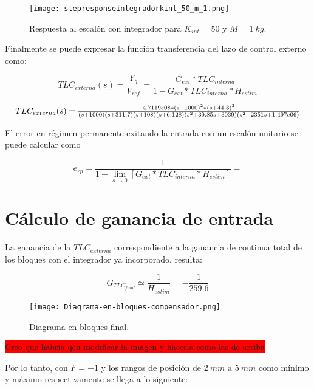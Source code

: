 \begin{figure}[H]
	\centering
	\texttt{[image: stepresponseintegradorkint\_50\_m\_1.png]}
	\caption{Respuesta al escalón con integrador para $K_{int} =50$ y $M = 1 \:kg$.}
	\label{fig:respuesta-al-escalon-con-k-50-M-1}
\end{figure}

Finalmente se puede expresar la función transferencia del lazo de control externo como:

\begin{equation}
	TLC_{externa}(s)=\frac{Y_g}{V_{ref}}=\frac{G_{ext}*TLC_{interna}}{1-G_{ext}*TLC_{interna}*H_{estim}}
\end{equation}

\begin{equation*}
\resizebox{.99\hsize}{!}
{
$
TLC_{externa}(s)=\frac{4.7119e08*(s+1000)^2*(s+44.3)^2}{(s+1000)(s+311.7)(s+108)(s+6.128)(s^2 + 39.85s + 3039)(s^2 + 2351s + 1.497e06)}
$
}
\end{equation*}

El error en régimen permanente exitando la entrada con un escalón unitario se puede calcular como

\begin{equation*}
	e_{rp}=\frac{1}{1-\lim\limits_{s \to 0}[G_{ext}*TLC_{interna}*H_{estim}]}=
\end{equation*}


\section{Cálculo de ganancia de entrada}

\noindent La ganancia de la $TLC_{externa}$ correspondiente a la ganancia de continua total de los bloques con el integrador ya incorporado, resulta:

\begin{equation} 
	G_{TLC_{final}} \simeq \frac{1}{H_{estim}} = - \frac{1}{259.6}
\end{equation}

\begin{figure}[H]
	\centering
	\texttt{[image: Diagrama-en-bloques-compensador.png]}
	\caption{Diagrama en bloques final.}
	\label{fig:diag-bloques-compensador}
\end{figure}

\colorbox{red}{Creo que habría qeu modificar la imagen y hacerla como las de arriba}

\noindent Por lo tanto, con $F=-1$ y los rangos de posición de $2\:mm$ a $5\:mm$ como mínimo y máximo respectivamente se llega a lo siguiente:

